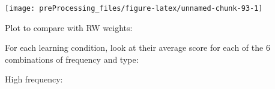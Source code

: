 \documentclass[
]{article}
\newenvironment{Shaded}{\begin{snugshade}}{\end{snugshade}}
\newcommand{\KeywordTok}[1]{\textcolor[rgb]{0.13,0.29,0.53}{\textbf{#1}}}
\newcommand{\NormalTok}[1]{#1}
\newcommand{\OperatorTok}[1]{\textcolor[rgb]{0.81,0.36,0.00}{\textbf{#1}}}
\newcommand{\StringTok}[1]{\textcolor[rgb]{0.31,0.60,0.02}{#1}}
\begin{document}
\begin{center}\texttt{[image: preProcessing\_files/figure-latex/unnamed-chunk-93-1]} \end{center}

Plot to compare with RW weights:

\begin{Shaded}
\end{Shaded}

For each learning condition, look at their average score for each of the
6 combinations of frequency and type:

High frequency:
\end{document}
